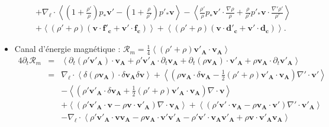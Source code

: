 \begin{itemize}
\begin{eqnarray}
&&+  \nabla_{\boldsymbol{\ell}} \cdot \left< \left(1+\frac{\rho'}{\rho}\right)p_*  \boldsymbol{v'} -  \left(1+\frac{\rho}{\rho'}\right)p'_*  \boldsymbol{v} \right>- \left<\frac{\rho'}{\rho} p_*  \boldsymbol{v'} \cdot \frac{\nabla \rho}{\rho} + \frac{\rho}{\rho'} p'_*  \boldsymbol{v} \cdot \frac{\nabla' \rho'}{\rho'} \right>\nonumber\\
&&+  \left<\left(\rho' + \rho\right)\left(\boldsymbol{v} \cdot \boldsymbol{f'_c} + \boldsymbol{v'} \cdot \boldsymbol{f_c}\right) \right>+ \left<\left(\rho' + \rho\right)\left(\boldsymbol{v} \cdot \boldsymbol{d'_c} + \boldsymbol{v'} \cdot \boldsymbol{d_c}\right)\right> .
\end{eqnarray}
    \item Canal d'énergie magnétique : $\mathcal{R}_{m} = \frac{1}{4}\left<\left(\rho'+\rho\right)\boldsymbol{v'_A} \cdot \boldsymbol{v_A}\right> $
\begin{eqnarray}
\label{eq:turb_cpi_Rm} 4\partial_t \mathcal{R}_{m} &=& \left<\partial_t \left(\rho' \boldsymbol{v'_A} \right)\cdot  \boldsymbol{v_A}  + \rho' \boldsymbol{v'_A} \cdot  \partial_t \boldsymbol{v_A} + \partial_t \left(\rho \boldsymbol{v_A} \right)\cdot  \boldsymbol{v'_A}  + \rho \boldsymbol{v_A} \cdot  \partial_t \boldsymbol{v'_A} \right> \nonumber\\
&=&\nabla_{\boldsymbol{\ell}} \cdot \left<\delta \left(\rho\boldsymbol{v_A}\right) \cdot \delta \boldsymbol{v_A} \delta \boldsymbol{v} \right> + \left<\left(\rho \boldsymbol{v_A} \cdot \delta \boldsymbol{v_A} -\frac{1}{2} \left(\rho'+\rho\right) \boldsymbol{v'_A} \cdot \boldsymbol{v_A}\right)\nabla' \cdot \boldsymbol{v'}\right>\nonumber\\
&&-  \left<\left(\rho' \boldsymbol{v'_A} \cdot \delta \boldsymbol{v_A} + \frac{1}{2} \left(\rho'+\rho\right) \boldsymbol{v'_A} \cdot \boldsymbol{v_A}\right)\nabla \cdot \boldsymbol{v}\right>\\
&& + \left<\left( \rho' \boldsymbol{v'_A} \cdot \boldsymbol{v} - \rho \boldsymbol{v} \cdot \boldsymbol{v'_A}  \right)\nabla \cdot \boldsymbol{v_A} \right> + \left<\left(\rho' \boldsymbol{v'} \cdot \boldsymbol{v_A} -  \rho \boldsymbol{v_A} \cdot \boldsymbol{v'} \right)\nabla' \cdot \boldsymbol{v'_A} \right>\nonumber\\
&&-\nabla_{\boldsymbol{\ell}} \cdot \left< \rho' \boldsymbol{v'_A}\cdot  \boldsymbol{v} \boldsymbol{v_A} - \rho \boldsymbol{v_A}\cdot  \boldsymbol{v'} \boldsymbol{v'_A}-\rho' \boldsymbol{v'} \cdot\boldsymbol{v_A}\boldsymbol{v'_A} +  \rho  \boldsymbol{v} \cdot\boldsymbol{v'_A}\boldsymbol{v_A}\right> \nonumber\\

\end{eqnarray}
\end{itemize}
